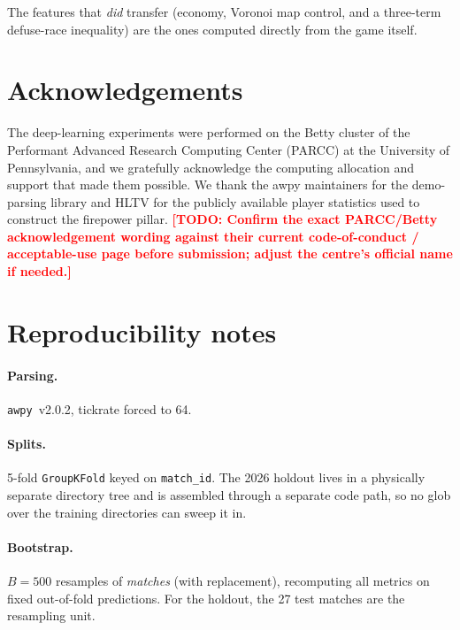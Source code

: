 \documentclass[11pt,a4paper]{article}
\newcommand{\todo}[1]{\textcolor{red}{\textbf{[TODO: #1]}}}
\begin{document}
The features that \emph{did} transfer (economy, Voronoi map control, and a three-term
defuse-race inequality) are the ones computed directly from the game itself.

\section*{Acknowledgements}
The deep-learning experiments were performed on the Betty cluster of the Performant Advanced Research
Computing Center (PARCC) at the University of Pennsylvania, and we gratefully acknowledge the computing
allocation and support that made them possible. We thank the awpy maintainers for the demo-parsing
library and HLTV for the publicly available player statistics used to construct the firepower pillar.
\todo{Confirm the exact PARCC/Betty acknowledgement wording against their current code-of-conduct /
acceptable-use page before submission; adjust the centre's official name if needed.}




\appendix

\section{Reproducibility notes}
\label{app:repro}

\paragraph{Parsing.} \texttt{awpy}~v2.0.2, tickrate forced to 64.

\paragraph{Splits.} 5-fold \texttt{GroupKFold} keyed on \texttt{match\_id}. The 2026 holdout lives
in a physically separate directory tree and is assembled through a separate code path, so no glob
over the training directories can sweep it in.

\paragraph{Bootstrap.} $B = 500$ resamples of \emph{matches} (with replacement), recomputing all
metrics on fixed out-of-fold predictions. For the holdout, the 27 test matches are the resampling
unit.
\end{document}
